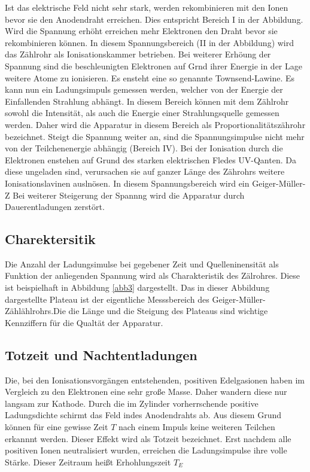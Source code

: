\documentclass[11pt,ngerman,a4paper]{article}
\begin{document}
\noindent
Ist das elektrische Feld nicht sehr stark, werden rekombinieren mit den Ionen bevor sie den Anodendraht erreichen. Dies entspricht Bereich I in der Abbildung. Wird die Spannung erh\"oht erreichen mehr Elektronen den Draht bevor sie rekombinieren k\"onnen. In diesem Spannungsbereich (II in der Abbildung) wird das Z\"ahlrohr als Ionisationskammer betrieben. Bei weiterer Erh\"oung der Spannung sind  die beschleunigten Elektronen auf Grnd ihrer Energie in der Lage weitere Atome zu ionisieren. Es ensteht eine so genannte Townsend-Lawine. Es kann nun ein Ladungsimpuls gemessen werden, welcher von der Energie der Einfallenden Strahlung abh\"angt. In diesem Bereich k\"onnen mit dem Z\"ahlrohr sowohl die Intensit\"at, als auch die Energie einer Strahlungsquelle gemessen werden. Daher wird die Apparatur in diesem Bereich als Proportionalit\"atsz\"ahrohr bezeichnet. 
Steigt die Spannung weiter an, sind die Spannungsimpulse nicht mehr von der Teilchenenergie abh\"angig (Bereich IV). Bei der Ionisation durch die Elektronen enstehen auf Grund des starken elektrischen Fledes UV-Qanten. Da diese ungeladen sind, verursachen sie auf ganzer L\"ange des Z\"ahrohrs weitere Ionisationslavinen ausln\"osen. In diesem Spannungsbereich wird ein Geiger-M\"uller-Z
Bei weiterer Steigerung der Spannng wird die Apparatur durch Dauerentladungen zerst\"ort.
\subsection{Charektersitik}
Die Anzahl der Ladungsimulse bei gegebener Zeit und Quelleninensit\"at als Funktion der anliegenden Spannung wird als Charakteristik des Z\"alrohres. Diese ist beispielhaft in Abbildung \ref{abb3} dargestellt. Das in dieser Abbildung dargestellte Plateau ist der eigentliche Messsbereich des Geiger-M\"uller-Z\"ahl\"ahlrohrs.Die die L\"ange und die Steigung des Plateaus sind wichtige Kennziffern f\"ur die Qualt\"at der Apparatur.
 
\subsection{Totzeit und Nachtentladungen}

Die, bei den Ionisationsvorg\"angen entstehenden, positiven Edelgasionen haben im Vergleich zu den Elektronen eine sehr gro\ss e Masse. Daher wandern diese nur langsam zur Kathode. Durch die im Zylinder vorherrschende positive Ladungsdichte schirmt das Feld indes Anodendrahts ab. Aus diesem Grund k\"onnen f\"ur eine gewisse Zeit $T$ nach einem Impuls keine weiteren Teilchen erkannnt werden. Dieser Effekt wird als Totzeit bezeichnet. Erst nachdem alle positiven Ionen neutralisiert wurden, erreichen die Ladungsimpulse ihre volle St\"arke. Dieser Zeitraum heißt Erhohlungszeit $T_E$
\end{document}
